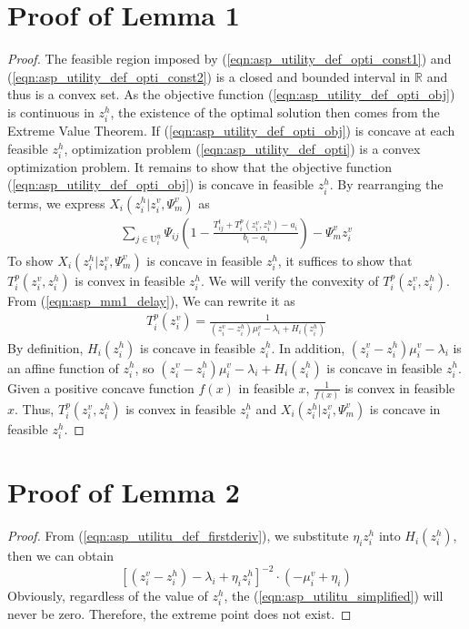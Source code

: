 \documentclass[10pt,journal, compsoc]{IEEEtran}
\begin{document}
    \section{Proof of Lemma 1}\label{appendix:lemma_1}
    \begin{proof}
    The feasible region imposed by (\ref{eqn:asp_utility_def_opti_const1}) and (\ref{eqn:asp_utility_def_opti_const2}) is a closed and bounded interval in $\mathbb{R}$ and thus is a convex set. As the objective function (\ref{eqn:asp_utility_def_opti_obj}) is continuous in $z_i^h$, the existence of the optimal solution then comes from the Extreme Value Theorem. If (\ref{eqn:asp_utility_def_opti_obj}) is concave at each feasible $z_i^h$, optimization problem (\ref{eqn:asp_utility_def_opti}) is a convex optimization problem. It remains to show that the objective function (\ref{eqn:asp_utility_def_opti_obj}) is concave in feasible $z_i^h$. By rearranging the terms, we express $X_i(z_i^h|z_i^v,\Psi_m^v)$ as
    \begin{equation}
    \begin{aligned}
        \sum_{j \in \mathrm{U}_i^{n}}\Psi_{ij}(1-\frac{T_{ij}^t+T_i^p(z_i^v, z_i^h)-a_i}{b_i-a_i})- \Psi_m^v z_i^v 
    \end{aligned}
    \end{equation}
    To show $X_i(z_i^h|z_i^v,\Psi_m^v)$ is concave in feasible $z_i^h$, it suffices to show that $T_i^p(z_i^v, z_i^h)$ is convex in feasible $z_i^h$. We will verify the convexity of $T_i^p(z_i^v, z_i^h)$. From (\ref{eqn:asp_mm1_delay}), We can rewrite it as
    \begin{equation} 
    \begin{aligned}
    T_i^p(z_i^v)=\frac{1}{(z_i^v-z_i^h)\mu_i^v - \lambda_i + H_i(z_i^h)}
    \end{aligned}
    \end{equation}
    By definition, $H_i(z_i^h)$ is concave in feasible $z_i^h$. In addition, $(z_i^v-z_i^h)\mu_i^v - \lambda_i$ is an affine function of $z_i^h$, so $(z_i^v-z_i^h)\mu_i^v - \lambda_i + H_i(z_i^h)$ is concave in feasible $z_i^h$. Given a positive concave function $f(x)$ in feasible $x$, $\frac{1}{f(x)}$ is convex in feasible $x$\cite[Chapter~3.2]{boyd2004convex}. Thus, $T_i^p(z_i^v, z_i^h)$ is convex in feasible $z_i^h$ and $X_i(z_i^h|z_i^v,\Psi_m^v)$ is concave in feasible $z_i^h$.
    \end{proof}

  \section{Proof of Lemma 2}\label{appendix:lemma_2}
    \begin{proof}
    From (\ref{eqn:asp_utilitu_def_firstderiv}), we substitute $\eta_i{z_i^h}$ into $H_i(z_i^h)$, then we can obtain
    \begin{equation} \label{eqn:asp_utilitu_simplified}
    [(z_i^v - z_i^h) - \lambda_i + \eta_i{z_i^h}]^{-2} \cdot (-\mu_i^v + \eta_i)
    \end{equation}
    Obviously, regardless of the value of $z_i^h$, the (\ref{eqn:asp_utilitu_simplified}) will never be zero. Therefore, the extreme point does not exist.\qedhere
    \end{proof}
\end{document}
